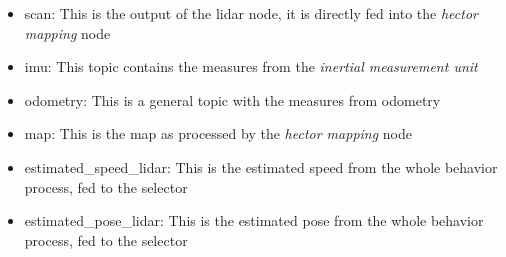 \begin{itemize}
  \item scan: This is the output of the lidar node, it is directly fed into the \textit{hector mapping} node
  \item imu: This topic contains the measures from the \textit{inertial measurement unit}
  \item odometry: This is a general topic with the measures from odometry
  \item map: This is the map as processed by the \textit{hector mapping} node
  \item estimated\_speed\_lidar: This is the estimated speed from the whole behavior process, fed to the selector
  \item estimated\_pose\_lidar: This is the estimated pose from the whole behavior process, fed to the selector
\end{itemize}